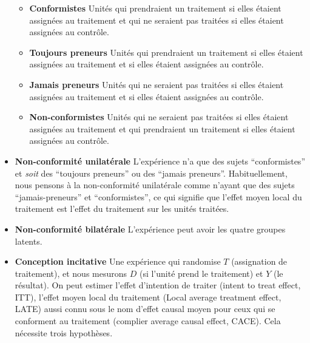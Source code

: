 \documentclass[12pt,]{book}
\providecommand{\tightlist}{%
  \setlength{\itemsep}{0pt}\setlength{\parskip}{0pt}}
\begin{document}
\begin{itemize}
  \begin{itemize}
  \tightlist
  \item
    \textbf{Conformistes} Unités qui prendraient un traitement si elles étaient assignées au traitement et qui ne seraient pas traitées si elles étaient assignées au contrôle.
  \item
    \textbf{Toujours preneurs} Unités qui prendraient un traitement si elles étaient assignées au traitement et si elles étaient assignées au contrôle.
  \item
    \textbf{Jamais preneurs} Unités qui ne seraient pas traitées si elles étaient assignées au traitement et si elles étaient assignées au contrôle.
  \item
    \textbf{Non-conformistes} Unités qui ne seraient pas traitées si elles étaient assignées au traitement et qui prendraient un traitement si elles étaient assignées au contrôle.
  \end{itemize}
\item
  \textbf{Non-conformité unilatérale} L'expérience n'a que des sujets ``conformistes'' et \emph{soit} des ``toujours preneurs'' ou des ``jamais preneurs''.
  Habituellement, nous pensons à la non-conformité unilatérale comme n'ayant que des sujets ``jamais-preneurs'' et ``conformistes'', ce qui signifie que l'effet moyen local du traitement est l'effet du traitement sur les unités traitées.
\item
  \textbf{Non-conformité bilatérale} L'expérience peut avoir les quatre groupes latents.
\item
  \textbf{Conception incitative} Une expérience qui randomise \(T\) (assignation de traitement), et nous mesurons \(D\) (si l'unité prend le traitement) et \(Y\) (le résultat).
  On peut estimer l'effet d'intention de traiter (intent to treat effect, ITT), l'effet moyen local du traitement (Local average treatment effect, LATE) aussi connu sous le nom d'effet causal moyen pour ceux qui se conforment au traitement (complier average causal effect, CACE). Cela nécessite trois hypothèses.


\end{itemize}
\end{document}
